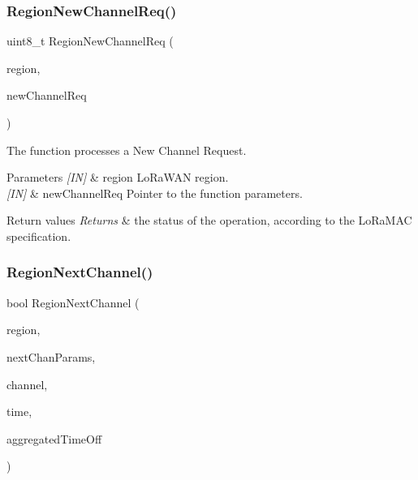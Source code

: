 \subsubsection{\texorpdfstring{Region\+New\+Channel\+Req()}{RegionNewChannelReq()}}
{\footnotesize\ttfamily uint8\+\_\+t Region\+New\+Channel\+Req (\begin{DoxyParamCaption}\item[{\hyperlink{group__LORAMAC_ga80c48efda9ae02e14b58160d34a798dd}{Lo\+Ra\+Mac\+Region\+\_\+t}}]{region,  }\item[{\hyperlink{group__REGION_gae2abcdb6dbb843c9faf5fd3009eca9d6}{New\+Channel\+Req\+Params\+\_\+t} $\ast$}]{new\+Channel\+Req }\end{DoxyParamCaption})}



The function processes a New Channel Request. 


\begin{DoxyParams}{Parameters}
{\em \mbox{[}\+I\+N\mbox{]}} & region Lo\+Ra\+W\+AN region.\\
\hline
{\em \mbox{[}\+I\+N\mbox{]}} & new\+Channel\+Req Pointer to the function parameters.\\
\hline
\end{DoxyParams}

\begin{DoxyRetVals}{Return values}
{\em Returns} & the status of the operation, according to the Lo\+Ra\+M\+AC specification. \\
\hline
\end{DoxyRetVals}
\mbox{\label{group__REGION_ga2139de3f2832789797c8853764655398}} 
\subsubsection{\texorpdfstring{Region\+Next\+Channel()}{RegionNextChannel()}}
{\footnotesize\ttfamily bool Region\+Next\+Channel (\begin{DoxyParamCaption}\item[{\hyperlink{group__LORAMAC_ga80c48efda9ae02e14b58160d34a798dd}{Lo\+Ra\+Mac\+Region\+\_\+t}}]{region,  }\item[{\hyperlink{group__REGION_ga115f5e83afae352c0a3dcdc193374040}{Next\+Chan\+Params\+\_\+t} $\ast$}]{next\+Chan\+Params,  }\item[{uint8\+\_\+t $\ast$}]{channel,  }\item[{\hyperlink{utilities_8h_a4215ca43d3e953099ea758ce428599d0}{Timer\+Time\+\_\+t} $\ast$}]{time,  }\item[{\hyperlink{utilities_8h_a4215ca43d3e953099ea758ce428599d0}{Timer\+Time\+\_\+t} $\ast$}]{aggregated\+Time\+Off }\end{DoxyParamCaption})}



